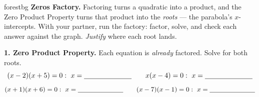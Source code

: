 \documentclass[10pt]{article}
\begin{document}

\vspace{0.08in}

\begin{headlinebox}{forestbg}
\small\textbf{Zeros Factory.} Factoring turns a quadratic into a product, and the Zero Product Property
turns that product into the \emph{roots} --- the parabola's $x$-intercepts. With your partner, run the
factory: factor, solve, and check each answer against the graph. \emph{Justify} where each root lands.
\end{headlinebox}

\vspace{0.06in}

\begin{tcolorbox}[colback=white, colframe=black!40, title=\textbf{Tier R --- Remediate},
    fonttitle=\bfseries, arc=1.5mm, left=3mm, right=3mm, top=2mm, bottom=2mm, breakable]
\textbf{1. Zero Product Property.} Each equation is \emph{already} factored. Solve for both roots.
\[
  (x-2)(x+5)=0:\ x=\blank{2.4cm} \qquad x(x-4)=0:\ x=\blank{2.4cm}
\]
\[
  (x+1)(x+6)=0:\ x=\blank{2.4cm} \qquad (x-7)(x-1)=0:\ x=\blank{2.4cm}
\]


\end{tcolorbox}
\end{document}

